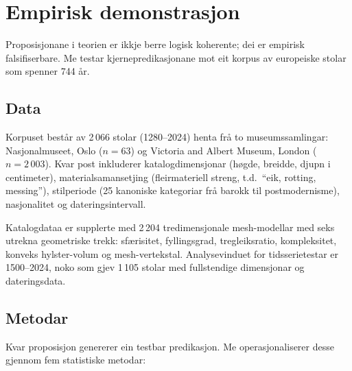 \section{Empirisk demonstrasjon}
\label{sec:empirical-nn}

Proposisjonane i teorien er ikkje berre logisk koherente; dei er empirisk falsifiserbare. Me testar kjernepredikasjonane mot eit korpus av europeiske stolar som spenner 744 år.

\subsection{Data}

Korpuset består av 2\,066 stolar (1280--2024) henta frå to museumssamlingar: Nasjonalmuseet, Oslo ($n = 63$) og Victoria and Albert Museum, London ($n = 2\,003$). Kvar post inkluderer katalogdimensjonar (høgde, breidde, djupn i centimeter), materialsamansetjing (fleirmateriell streng, t.d.\ ``eik, rotting, messing''), stilperiode (25 kanoniske kategoriar frå barokk til postmodernisme), nasjonalitet og dateringsintervall.

Katalogdataa er supplerte med 2\,204 tredimensjonale mesh-modellar med seks utrekna geometriske trekk: sfærisitet, fyllingsgrad, tregleiksratio, kompleksitet, konveks hylster-volum og mesh-vertekstal. Analysevinduet for tidsserietestar er 1500--2024, noko som gjev 1\,105 stolar med fullstendige dimensjonar og dateringsdata.

\subsection{Metodar}

Kvar proposisjon genererer ein testbar predikasjon. Me operasjonaliserer desse gjennom fem statistiske metodar:


